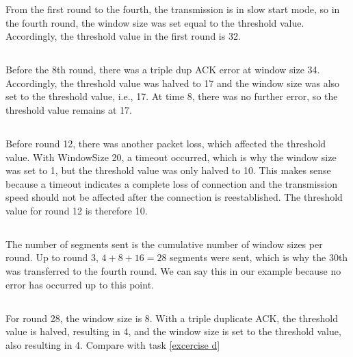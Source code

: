 \documentclass{article}
\begin{document}
        From the first round to the fourth, the transmission is in slow start mode, so in the fourth round, the window size was set equal to the threshold value. Accordingly, the threshold value in the first round is 32.
        
    \subsection{}

        Before the 8th round, there was a triple dup ACK error at window size 34. Accordingly, the threshold value was halved to 17 and the window size was also set to the threshold value, i.e., 17. At time 8, there was no further error, so the threshold value remains at 17.

    \subsection{}

        Before round 12, there was another packet loss, which affected the threshold value. With WindowSize 20, a timeout occurred, which is why the window size was set to 1, but the threshold value was only halved to 10. This makes sense because a timeout indicates a complete loss of connection and the transmission speed should not be affected after the connection is reestablished. The threshold value for round 12 is therefore 10.

    \subsection{}

        The number of segments sent is the cumulative number of window sizes per round. Up to round 3, $4 + 8 + 16 = 28$ segments were sent, which is why the 30th was transferred to the fourth round. We can say this in our example because no error has occurred up to this point.
    
    \subsection{}

        For round 28, the window size is 8. With a triple duplicate ACK, the threshold value is halved, resulting in 4, and the window size is set to the threshold value, also resulting in 4. Compare with task \ref{excercise d}

    \section{}
\end{document}
